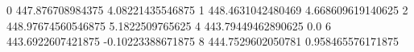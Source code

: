 0 447.876708984375 4.08221435546875
1 448.4631042480469 4.668609619140625
2 448.97674560546875 5.1822509765625
4 443.79449462890625 0.0
6 443.6922607421875 -0.10223388671875
8 444.7529602050781 0.958465576171875
